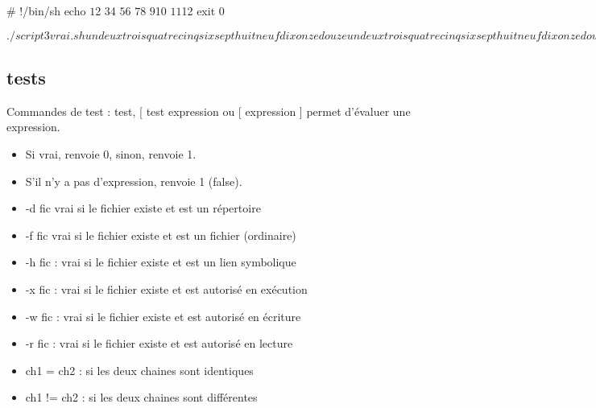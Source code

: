 \documentclass[10pt]{beamer}
\begin{document}
\begin{frame}[fragile]{}
\begin{mylisting}
# !/bin/sh
echo $1 $2 $3 $4 $5 $6 $7 $8 $9 ${10} ${11} ${12}
exit 0
\end{mylisting}
\pause
\begin{mylisting}
$ ./script3 vrai.sh un deux trois quatre cinq six
sept huit neuf dix onze douze
un deux trois quatre cinq six sept huit neuf dix onze
douze
$
\end{mylisting}
\end{frame}

\subsection{tests}
\begin{frame}[fragile]{Commandes de test : test, [ }
\alert{test} expression ou [ expression ] permet d’évaluer une expression.

\begin{itemize}
\item Si vrai, renvoie 0, sinon, renvoie 1.
\item S’il n’y a pas d’expression, renvoie 1 (false).
\end{itemize}

\pause

\begin{itemize}
\item \alert{-d fic} vrai si le fichier existe et est un répertoire
\item \alert{-f fic} vrai si le fichier existe et est un fichier (ordinaire)
\item \alert{-h fic} : vrai si le fichier existe et est un lien symbolique
\item \alert{-x fic} : vrai si le fichier existe et est autorisé en exécution
\item \alert{-w fic} : vrai si le fichier existe et est autorisé en écriture
\item \alert{-r fic} : vrai si le fichier existe et est autorisé en lecture
\item \alert{ch1 = ch2} : si les deux chaines sont identiques
\item \alert{ch1 != ch2} : si les deux chaines sont différentes
\end{itemize}
\end{frame}
\end{document}
